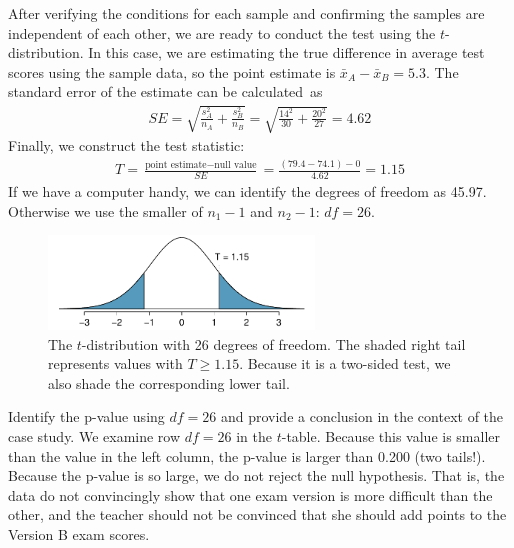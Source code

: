 {After verifying the conditions for each sample and confirming the samples are independent of each other, we are ready to conduct the test using the $t$-distribution. In this case, we are estimating the true difference in average test scores using the sample data, so the point estimate is $\bar{x}_A - \bar{x}_B = 5.3$. The standard error of the estimate can be calculated~as
\begin{eqnarray*}
SE = \sqrt{\frac{s_A^2}{n_A} + \frac{s_B^2}{n_B}} = \sqrt{\frac{14^2}{30} + \frac{20^2}{27}} = 4.62
\end{eqnarray*}
Finally, we construct the test statistic:
\begin{eqnarray*}
T = \frac{\text{point estimate} - \text{null value}}{SE} = \frac{(79.4-74.1) - 0}{4.62} = 1.15
\end{eqnarray*}
If we have a computer handy, we can identify the degrees of freedom as 45.97. Otherwise we use the smaller of $n_1-1$ and $n_2-1$: $df=26$. 

\begin{figure}[h]
\centering
\includegraphics[width=0.63\textwidth]{ch_inference_for_means/figures/pValueOfTwoTailAreaOfExamVersionsWhereDFIs26/pValueOfTwoTailAreaOfExamVersionsWhereDFIs26}
\caption{The $t$-distribution with 26 degrees of freedom. The shaded right tail represents values with $T \geq 1.15$. Because it is a two-sided test, we also shade the corresponding lower tail.}
\label{pValueOfTwoTailAreaOfExamVersionsWhereDFIs26}
\end{figure}

\begin{example}{Identify the p-value using $df = 26$ and provide a conclusion in the context of the case study.}
We examine row $df=26$ in the $t$-table. Because this value is smaller than the value in the left column, the p-value is larger than 0.200 (two tails!). Because the p-value is so large, we do not reject the null hypothesis. That is, the data do not convincingly show that one exam version is more difficult than the other, and the teacher should not be convinced that she should add points to the Version B exam scores.

\end{example}


}
